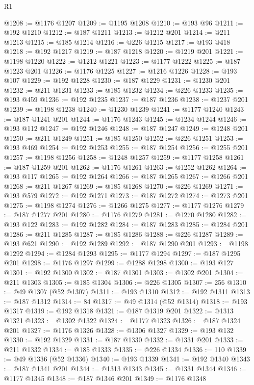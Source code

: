 \begin{lexlean}{R1}
\begin{coremodule}
@1208 := @1176 @1207
@1209 := @1195 @1208
@1210 := @193 @96
@1211 := @192 @1210
@1212 := @187 @1211
@1213 := @1212 @201
@1214 := @211 @1213
@1215 := @185 @1214
@1216 := @226 @1215
@1217 := @193 @418
@1218 := @192 @1217
@1219 := @187 @1218
@1220 := @1219 @201
@1221 := @1198 @1220
@1222 := @1212 @1221
@1223 := @1177 @1222
@1225 := @187 @1223 @201
@1226 := @1176 @1225
@1227 := @1216 @1226
@1228 := @193 @107
@1229 := @192 @1228
@1230 := @187 @1229
@1231 := @1230 @201
@1232 := @211 @1231
@1233 := @185 @1232
@1234 := @226 @1233
@1235 := @193 @459
@1236 := @192 @1235
@1237 := @187 @1236
@1238 := @1237 @201
@1239 := @1198 @1238
@1240 := @1230 @1239
@1241 := @1177 @1240
@1243 := @187 @1241 @201
@1244 := @1176 @1243
@1245 := @1234 @1244
@1246 := @193 @112
@1247 := @192 @1246
@1248 := @187 @1247
@1249 := @1248 @201
@1250 := @211 @1249
@1251 := @185 @1250
@1252 := @226 @1251
@1253 := @193 @469
@1254 := @192 @1253
@1255 := @187 @1254
@1256 := @1255 @201
@1257 := @1198 @1256
@1258 := @1248 @1257
@1259 := @1177 @1258
@1261 := @187 @1259 @201
@1262 := @1176 @1261
@1263 := @1252 @1262
@1264 := @193 @117
@1265 := @192 @1264
@1266 := @187 @1265
@1267 := @1266 @201
@1268 := @211 @1267
@1269 := @185 @1268
@1270 := @226 @1269
@1271 := @193 @579
@1272 := @192 @1271
@1273 := @187 @1272
@1274 := @1273 @201
@1275 := @1198 @1274
@1276 := @1266 @1275
@1277 := @1177 @1276
@1279 := @187 @1277 @201
@1280 := @1176 @1279
@1281 := @1270 @1280
@1282 := @193 @122
@1283 := @192 @1282
@1284 := @187 @1283
@1285 := @1284 @201
@1286 := @211 @1285
@1287 := @185 @1286
@1288 := @226 @1287
@1289 := @193 @621
@1290 := @192 @1289
@1292 := @187 @1290 @201
@1293 := @1198 @1292
@1294 := @1284 @1293
@1295 := @1177 @1294
@1297 := @187 @1295 @201
@1298 := @1176 @1297
@1299 := @1288 @1298
@1300 := @193 @127
@1301 := @192 @1300
@1302 := @187 @1301
@1303 := @1302 @201
@1304 := @211 @1303
@1305 := @185 @1304
@1306 := @226 @1305
@1307 := 256
@1310 := @49 @1307 (@52 @1307)
@1311 := @193 @1310
@1312 := @192 @1311
@1313 := @187 @1312
@1314 := 84
@1317 := @49 @1314 (@52 @1314)
@1318 := @193 @1317
@1319 := @192 @1318
@1321 := @187 @1319 @201
@1322 := @1313 @1321
@1323 := @1302 @1322
@1324 := @1177 @1323
@1326 := @187 @1324 @201
@1327 := @1176 @1326
@1328 := @1306 @1327
@1329 := @193 @132
@1330 := @192 @1329
@1331 := @187 @1330
@1332 := @1331 @201
@1333 := @211 @1332
@1334 := @185 @1333
@1335 := @226 @1334
@1336 := 110
@1339 := @49 @1336 (@52 @1336)
@1340 := @193 @1339
@1341 := @192 @1340
@1343 := @187 @1341 @201
@1344 := @1313 @1343
@1345 := @1331 @1344
@1346 := @1177 @1345
@1348 := @187 @1346 @201
@1349 := @1176 @1348

\end{coremodule}
\end{lexlean}
